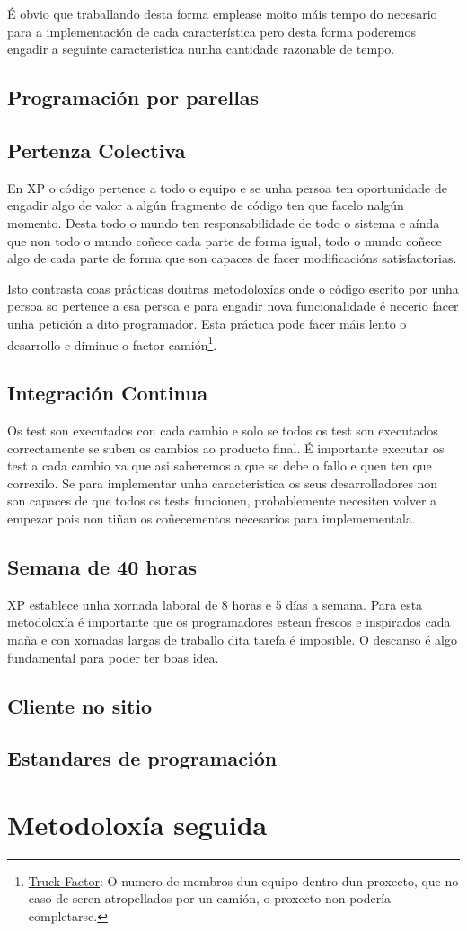 É obvio que traballando desta forma emplease moito máis tempo do necesario para a implementación de cada característica pero desta forma poderemos engadir a seguinte caracteristica nunha cantidade razonable de tempo.

\subsection{Programación por parellas}

\subsection{Pertenza Colectiva}
En XP o código pertence a todo o equipo e se unha persoa ten oportunidade de engadir algo de valor a algún fragmento de código ten que facelo nalgún momento. Desta todo o mundo ten responsabilidade de todo o sistema e aínda que non todo o mundo coñece cada parte de forma igual, todo o mundo coñece algo de cada parte de forma que son capaces de facer modificacións satisfactorias.

Isto contrasta coas prácticas doutras metodoloxías onde o código escrito por unha persoa so pertence a esa persoa e para engadir nova funcionalidade é necerio facer unha petición a dito programador. Esta práctica pode facer máis lento o desarrollo e diminue o factor camión\footnote{\href{http://en.wikipedia.org/wiki/Bus\_factor}{Truck Factor}: O numero de membros dun equipo dentro dun proxecto, que no caso de seren atropellados por un camión, o proxecto non podería completarse.}.

\subsection{Integración Continua}
Os test son executados con cada cambio e solo se todos os test son executados correctamente se suben os cambios ao producto final. É importante executar os test a cada cambio xa que asi saberemos a que se debe o fallo e quen ten que correxilo. Se para implementar unha caracteristica os seus desarrolladores non son capaces de que todos os tests funcionen, probablemente necesiten volver a empezar pois non tiñan os coñecementos necesarios para implemementala. 

\subsection{Semana de 40 horas}
XP establece unha xornada laboral de 8 horas e 5 días a semana. Para esta metodoloxía é importante que os programadores estean frescos e inspirados cada maña e con xornadas largas de traballo dita tarefa é imposible. O descanso é algo fundamental para poder ter boas idea.

\subsection{Cliente no sitio}

\subsection{Estandares de programación}

\section{Metodoloxía seguida}


